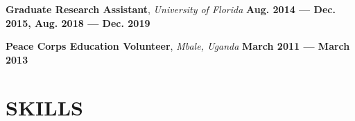 \documentclass[11pt,letterpaper,roman,colorlinks,linkcolor=blue]{moderncv}
\newcommand*{\modern}{\fontfamily{qhv}\selectfont}
\newcommand{\mystyle}[1]{\textcolor{mygrey}{\modern #1}}
\newcommand{\mysectionstyle}[1]{\large\mystyle{#1}}
\begin{document}
\textbf{Graduate Research Assistant}, \emph{University of Florida}
\hfill \textbf{Aug. 2014 --- Dec. 2015, Aug. 2018 --- Dec. 2019}

\textbf{Peace Corps Education Volunteer}, \emph{Mbale, Uganda}
\hfill \textbf{March 2011 --- March 2013}


\section{\mysectionstyle{SKILLS}}
\end{document}

